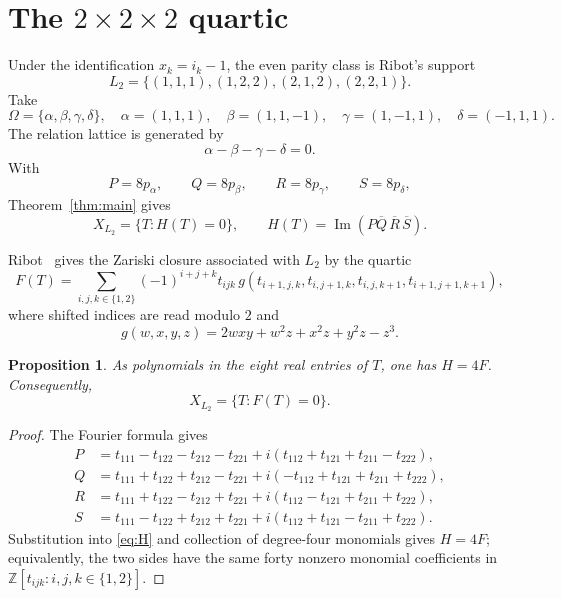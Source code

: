 \documentclass[11pt]{amsart}
\newtheorem{proposition}[theorem]{Proposition}
\theoremstyle{remark}
\newcommand{\Z}{\mathbb{Z}}
\newcommand{\Imag}{\operatorname{Im}}
\begin{document}
\section{The \texorpdfstring{$2\times2\times2$}{2 x 2 x 2} quartic}

Under the identification $x_k=i_k-1$, the even parity class is Ribot's
support
\[
L_2=\{(1,1,1),(1,2,2),(2,1,2),(2,2,1)\}.
\]
Take
\[
\Omega=\{\alpha,\beta,\gamma,\delta\},
\quad
\alpha=(1,1,1),
\quad
\beta=(1,1,-1),
\quad
\gamma=(1,-1,1),
\quad
\delta=(-1,1,1).
\]
The relation lattice is generated by
\[
\alpha-\beta-\gamma-\delta=0.
\]
With
\[
P=8p_\alpha,\qquad Q=8p_\beta,
\qquad R=8p_\gamma,\qquad S=8p_\delta,
\]
Theorem~\ref{thm:main} gives
\begin{equation}\label{eq:H}
X_{L_2}=\{T:H(T)=0\},
\qquad
H(T)=\Imag(P\overline Q\,\overline R\,\overline S).
\end{equation}

Ribot~\cite[Example~4.1]{Ribot} gives the Zariski closure associated with
$L_2$ by the quartic
\begin{equation}\label{eq:F}
F(T)=
\sum_{i,j,k\in\{1,2\}}(-1)^{i+j+k}t_{ijk}\,
g(t_{i+1,j,k},t_{i,j+1,k},t_{i,j,k+1},t_{i+1,j+1,k+1}),
\end{equation}
where shifted indices are read modulo $2$ and
\[
g(w,x,y,z)=2wxy+w^2z+x^2z+y^2z-z^3.
\]

\begin{proposition}\label{prop:quartic}
As polynomials in the eight real entries of $T$, one has $H=4F$.
Consequently,
\[
X_{L_2}=\{T:F(T)=0\}.
\]
\end{proposition}

\begin{proof}
The Fourier formula gives
\begin{align*}
P&=t_{111}-t_{122}-t_{212}-t_{221}
   +i(t_{112}+t_{121}+t_{211}-t_{222}),\\
Q&=t_{111}+t_{122}+t_{212}-t_{221}
   +i(-t_{112}+t_{121}+t_{211}+t_{222}),\\
R&=t_{111}+t_{122}-t_{212}+t_{221}
   +i(t_{112}-t_{121}+t_{211}+t_{222}),\\
S&=t_{111}-t_{122}+t_{212}+t_{221}
   +i(t_{112}+t_{121}-t_{211}+t_{222}).
\end{align*}
Substitution into \eqref{eq:H} and collection of degree-four monomials gives
$H=4F$; equivalently, the two sides have the same forty nonzero monomial
coefficients in $\Z[t_{ijk}:i,j,k\in\{1,2\}]$.
\end{proof}
\end{document}
